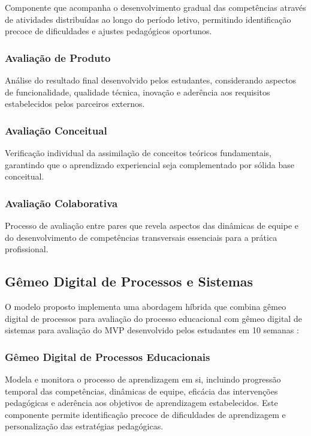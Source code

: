 \documentclass[12pt, a4paper, oneside]{abntex2}
\begin{document}
Componente que acompanha o desenvolvimento gradual das competências através de atividades distribuídas ao longo do período letivo, permitindo identificação precoce de dificuldades e ajustes pedagógicos oportunos.

\subsubsection{Avaliação de Produto}

Análise do resultado final desenvolvido pelos estudantes, considerando aspectos de funcionalidade, qualidade técnica, inovação e aderência aos requisitos estabelecidos pelos parceiros externos.

\subsubsection{Avaliação Conceitual}

Verificação individual da assimilação de conceitos teóricos fundamentais, garantindo que o aprendizado experiencial seja complementado por sólida base conceitual.

\subsubsection{Avaliação Colaborativa}

Processo de avaliação entre pares que revela aspectos das dinâmicas de equipe e do desenvolvimento de competências transversais essenciais para a prática profissional.

\subsection{Gêmeo Digital de Processos e Sistemas}

O modelo proposto implementa uma abordagem híbrida que combina gêmeo digital de processos para avaliação do processo educacional com gêmeo digital de sistemas para avaliação do MVP desenvolvido pelos estudantes em 10 semanas \cite{barricelli2019}:

\subsubsection{Gêmeo Digital de Processos Educacionais}

Modela e monitora o processo de aprendizagem em si, incluindo progressão temporal das competências, dinâmicas de equipe, eficácia das intervenções pedagógicas e aderência aos objetivos de aprendizagem estabelecidos. Este componente permite identificação precoce de dificuldades de aprendizagem e personalização das estratégias pedagógicas.
\end{document}
